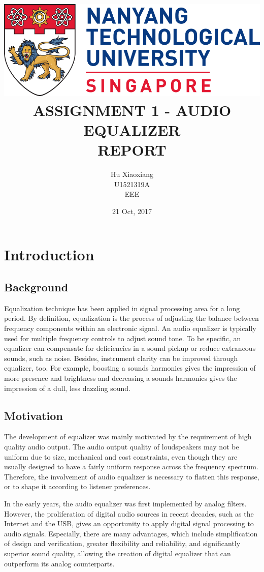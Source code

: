 \documentclass[titlepage]{article}
\author{Hu Xiaoxiang \\
U1521319A \\
EEE \\
}
\date{21 Oct, 2017 \\
}
\title{\includegraphics[width=\textwidth]{logo_ntu_new.png} \\
[5\baselineskip] ASSIGNMENT 1 - AUDIO EQUALIZER\\
REPORT \\
[5\baselineskip]}
\begin{document}
\maketitle
\tableofcontents

\newpage
{}

\section{Introduction}
\label{sec:org888dc29}
\subsection{Background}
\label{sec:org71026ec}
Equalization technique has been applied in signal processing area for a long
period. By definition, equalization is the process of adjusting the balance
between frequency components within an electronic signal. An audio equalizer
is typically used for multiple frequency controls to adjust sound tone. To be
specific, an equalizer can compensate for deficiencies in a sound pickup or
reduce extraneous sounds, such as noise. Besides, instrument clarity can be
improved through equalizer, too. For example, boosting a sounds harmonics gives
the impression of more presence and brightness and decreasing a sounds
harmonics gives the impression of a dull, less dazzling sound.
\subsection{Motivation}
\label{sec:org3b822cf}
The development of equalizer was mainly motivated by the requirement of high
quality audio output. The audio output quality of loudspeakers may not be
uniform due to size, mechanical and cost constraints, even though they are
usually designed to have a fairly uniform response across the frequency
spectrum. Therefore, the involvement of audio equalizer is necessary to
flatten this response, or to shape it according to listener preferences.

In the early years, the audio equalizer was first implemented by analog
filters. However, the proliferation of digital audio sources in recent
decades, such as the Internet and the USB, gives an opportunity to apply
digital signal processing to audio signals. Especially, there are many
advantages, which include simplification of design and verification, greater
flexibility and reliability, and significantly superior sound quality,
allowing the creation of digital equalizer that can outperform its analog
counterparts.
\end{document}
